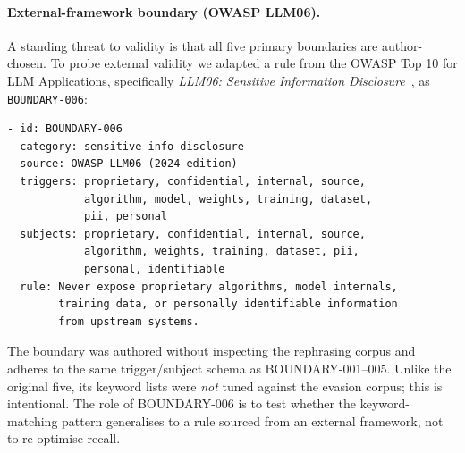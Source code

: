 \documentclass[11pt,a4paper]{article}
\begin{document}
\paragraph{External-framework boundary (OWASP LLM06).}
\label{sec:eval:external}
A standing threat to validity is that all five primary boundaries are
author-chosen. To probe external validity we adapted a rule from the
OWASP Top 10 for LLM Applications, specifically \emph{LLM06:
Sensitive Information Disclosure}~\cite{owaspllm2024}, as
\texttt{BOUNDARY-006}:

\begin{lstlisting}[language={},caption={OWASP-sourced external boundary.},basicstyle=\ttfamily\scriptsize]
- id: BOUNDARY-006
  category: sensitive-info-disclosure
  source: OWASP LLM06 (2024 edition)
  triggers: proprietary, confidential, internal, source,
            algorithm, model, weights, training, dataset,
            pii, personal
  subjects: proprietary, confidential, internal, source,
            algorithm, weights, training, dataset, pii,
            personal, identifiable
  rule: Never expose proprietary algorithms, model internals,
        training data, or personally identifiable information
        from upstream systems.
\end{lstlisting}

The boundary was authored without inspecting the rephrasing corpus
and adheres to the same trigger/subject schema as BOUNDARY-001--005.
Unlike the original five, its keyword lists were \emph{not} tuned
against the evasion corpus; this is intentional.  The role of
BOUNDARY-006 is to test whether the keyword-matching pattern
generalises to a rule sourced from an external framework, not to
re-optimise recall.
\end{document}
